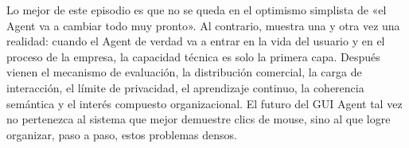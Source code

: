 Lo mejor de este episodio es que no se queda en el optimismo simplista de «el Agent va a cambiar todo muy pronto». Al contrario, muestra una y otra vez una realidad: cuando el Agent de verdad va a entrar en la vida del usuario y en el proceso de la empresa, la capacidad técnica es solo la primera capa. Después vienen el mecanismo de evaluación, la distribución comercial, la carga de interacción, el límite de privacidad, el aprendizaje continuo, la coherencia semántica y el interés compuesto organizacional. El futuro del GUI Agent tal vez no pertenezca al sistema que mejor demuestre clics de mouse, sino al que logre organizar, paso a paso, estos problemas densos.

